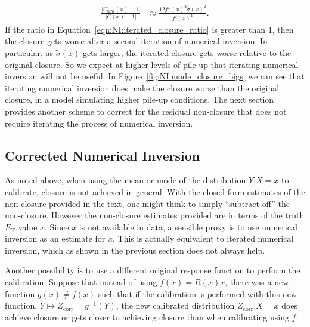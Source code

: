 \begin{align}
\frac{|C_\text{new}(x)-1|}{|C(x)-1|} &\approx \frac{12f''(x)^2\tilde{\sigma}(x)^2}{f'(x)^4}\label{eqn:NI:iterated_closure_ratio}.
\end{align}
If the ratio in Equation~\ref{eqn:NI:iterated_closure_ratio} is greater than 1, then the closure gets worse after a second iteration of numerical inversion.  In particular, as $\tilde{\sigma}(x)$ gets larger, the iterated closure gets worse relative to the original closure. So we expect at higher levels of pile-up that iterating numerical inversion will not be useful. In Figure~\ref{fig:NI:mode_closure_bigs} we can see that iterating numerical inversion does make the closure worse than the original closure, in a model simulating higher pile-up conditions.  The next section provides another scheme to correct for the residual non-closure that does not require iterating the process of numerical inversion.

\subsection{Corrected Numerical Inversion}
\label{sec:NI:corrected_numerical_inversion_text}
As noted above, when using the mean or mode of the distribution $Y|X=x$ to calibrate, closure is not achieved in general. With the closed-form estimates of the non-closure provided in the text, one might think to simply ``subtract off'' the non-closure. However the non-closure estimates provided are in terms of the truth $E_\text{T}$ value $x$.  Since $x$ is not available in data, a sensible proxy is to use numerical inversion as an estimate for $x$.  This is actually equivalent to iterated numerical inversion, which as shown in the previous section does not always help.

Another possibility is to use a different original response function to perform the calibration.  Suppose that instead of using $f(x)=R(x)x$, there was a new function $g(x)\ne f(x)$ such that if the calibration is performed with this new function, $Y\mapsto Z_\text{corr}=g^{-1}(Y)$, the new calibrated distribution $Z_\text{corr}|X=x$ does achieve closure or gets closer to achieving closure than when calibrating using $f$.


